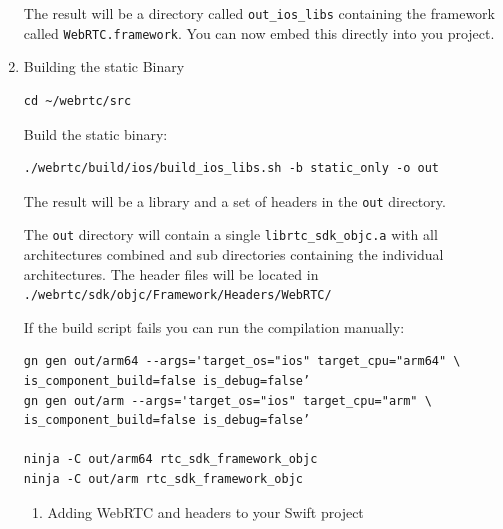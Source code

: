 \documentclass[a4paper,11pt]{article}
\begin{document}
\begin{enumerate}
The result will be a directory called \texttt{out\_ios\_libs} containing the
framework called \texttt{WebRTC.framework}.  You can now embed this directly
into you project.

\item Building the static Binary
\label{sec:orgheadline46}

\begin{verbatim}
cd ~/webrtc/src
\end{verbatim}

Build the static binary:

\begin{verbatim}
./webrtc/build/ios/build_ios_libs.sh -b static_only -o out
\end{verbatim}

The result will be a library and a set of headers in the \texttt{out}
directory.

The \texttt{out} directory will contain a single \texttt{librtc\_sdk\_objc.a} with all
architectures combined and sub directories containing the individual
architectures.  The header files will be located in
\texttt{./webrtc/sdk/objc/Framework/Headers/WebRTC/}

If the build script fails you can run the compilation manually:

\begin{verbatim}
gn gen out/arm64 --args='target_os="ios" target_cpu="arm64" \
is_component_build=false is_debug=false’
gn gen out/arm --args='target_os="ios" target_cpu="arm" \ 
is_component_build=false is_debug=false’

ninja -C out/arm64 rtc_sdk_framework_objc
ninja -C out/arm rtc_sdk_framework_objc
\end{verbatim}


\begin{enumerate}
\item Adding WebRTC and headers to your Swift project
\label{sec:orgheadline45}


\end{enumerate}
\end{enumerate}
\end{document}
